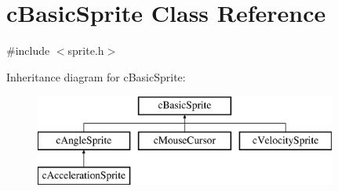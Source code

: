 \hypertarget{classc_basic_sprite}{\section{c\-Basic\-Sprite Class Reference}
\label{classc_basic_sprite}
}


{\ttfamily \#include $<$sprite.\-h$>$}

Inheritance diagram for c\-Basic\-Sprite\-:\begin{figure}[H]
\begin{center}
\leavevmode
\includegraphics[height=3.000000cm]{classc_basic_sprite}
\end{center}
\end{figure}
